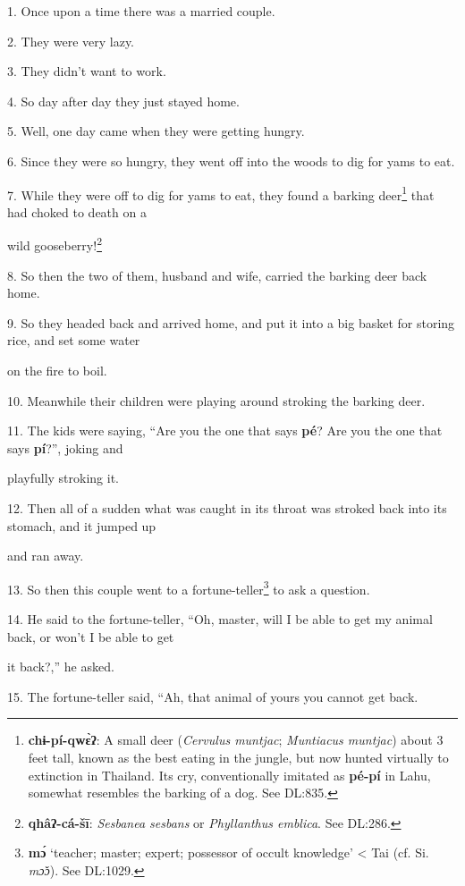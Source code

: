 \setcounter{footnote}{0}

1. Once upon a time there was a married couple.

2. They were very lazy.

3. They didn't want to work.

4. So day after day they just stayed home.

5. Well, one day came when they were getting hungry.

6. Since they were so hungry, they went off into the woods to dig for yams to eat.

7. While they were off to dig for yams to eat, they found a barking deer\footnote{\textbf{chɨ-pí-qwɛ̀ʔ}: A small deer (\textit{Cervulus muntjac}; \textit{Muntiacus muntjac}) about 3 feet tall, known as the best eating in the jungle, but now hunted virtually to extinction in Thailand. Its cry, conventionally imitated as \textbf{pé-pí} in Lahu, somewhat resembles the barking of a dog. See DL:835.} that
had choked to death on a

wild gooseberry!\footnote{\textbf{qhâʔ-cá-šī}: \textit{Sesbanea sesbans} or \textit{Phyllanthus emblica}. See DL:286.}

8. So then the two of them, husband and wife, carried the barking deer back home.

9. So they headed back and arrived home, and put it into a big basket for storing
rice, and set some water

on the fire to boil.

10. Meanwhile their children were playing around stroking the barking deer.

11. The kids were saying, ``Are you the one that says \textbf{pé}? Are you the
one that says \textbf{pí}?'', joking and

playfully stroking it.

12. Then all of a sudden what was caught in its throat was stroked back into its
stomach, and it jumped up

and ran away.

13. So then this couple went to a fortune-teller\footnote{\textbf{mɔ́} `teacher; master; expert; possessor of occult knowledge' < Tai (cf. Si. \textit{mɔ̌ɔ}). See DL:1029.} to ask a question.

14. He said to the fortune-teller, ``Oh, master, will I be able to get my animal
back, or won't I be able to get

it back?,'' he asked.

15. The fortune-teller said, ``Ah, that animal of yours you cannot get back.

